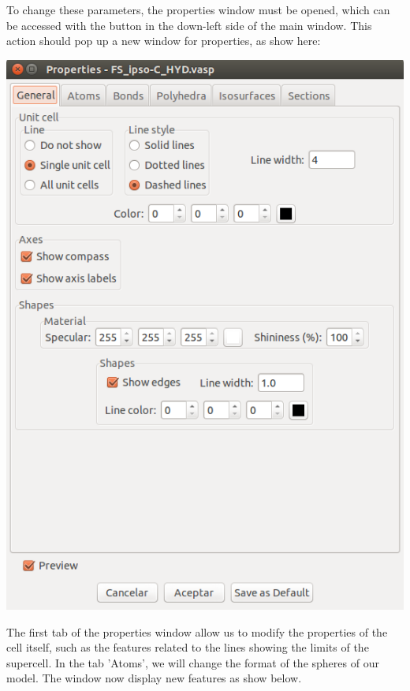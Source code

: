 \documentclass[11pt]{article}
\begin{document}
To change these parameters, the properties window must be opened, which can be accessed with the button in the down-left side of the main window. This action should pop up a new window for properties, as show here:

\begin{center}
\includegraphics[width=.9\linewidth]{./figures/VESTA/02_properties_window.png}
\end{center}

The first tab of the properties window allow us to modify the properties of the cell itself, such as the features related to the lines showing the limits of the supercell. In the tab 'Atoms', we will change the format of the spheres of our model. The window now display new features as show below. 
\end{document}
